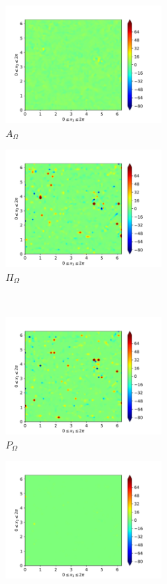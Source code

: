 \begin{figure}[H]
\begin{subfigure}{0.45\textwidth}
        \includegraphics[height=1.75in]{media/run-cds-65/A-enst-1380}
        \caption{$A_{\Omega}$}
    \end{subfigure}
    \newline
    \begin{subfigure}{0.45\textwidth}
        \includegraphics[height=1.75in]{media/run-cds-65/Pi-enst-1380}
        \caption{$\Pi_{\Omega}$}
    \end{subfigure}
    ~
    \begin{subfigure}{0.45\textwidth}
        \includegraphics[height=1.75in]{media/run-cds-65/P-enst-1380}
        \caption{$P_{\Omega}$}
    \end{subfigure}
    \newline
    \begin{subfigure}{0.45\textwidth}
        \includegraphics[height=1.75in]{media/run-cds-65/B-enst-1380}

\end{subfigure}
\end{figure}
